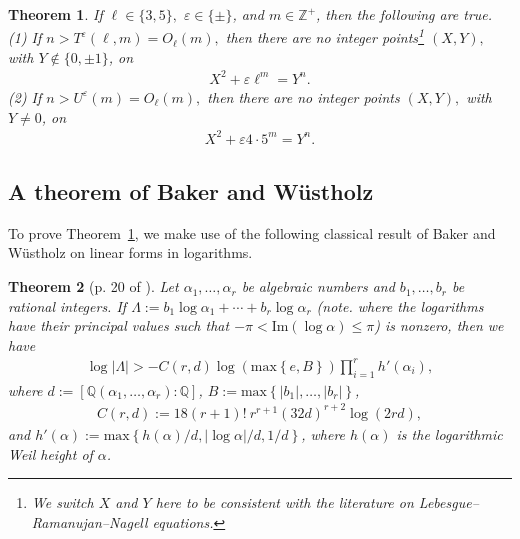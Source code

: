 \documentclass[12pt]{amsart}
\newtheorem{thm}{Theorem}[section]
\newcommand{\Z}{\mathbb{Z}}
\newcommand{\?}{\color{red}?}
\numberwithin{equation}{section}
\begin{document}
\begin{thm}\label{Explicit35}
If $\ell \in \{3, 5\},$ $\varepsilon\in \{\pm \}$, and $m\in \Z^{+}$, then the following are true.
\newline
(1)  If $n>T^{\varepsilon}(\ell,m)=O_{\ell}(m),$ then there are no integer points\footnote{We switch $X$ and $Y$ here to be consistent with the literature on Lebesgue--Ramanujan--Nagell equations.} $(X,Y),$ with $Y\not \in \{0,\pm 1\}$, on
\begin{align}\label{ell3}
X^2 +\varepsilon \ell^m=Y^n.
\end{align}
\newline
\noindent
(2) If $n>U^{\varepsilon}(m)=O_{\ell}(m),$ then there are no integer points $(X,Y),$ with $Y\neq 0$, on
\begin{align}\label{ell5}
X^2+\varepsilon 4\cdot 5^m = Y^n.
\end{align}
\end{thm}

\subsection{A theorem of Baker and W\"ustholz}
To prove Theorem~\ref{Explicit35}, we make use of the following classical result
of Baker and W\"ustholz \cite{BW} on linear forms in logarithms.


\begin{thm}[p. 20 of \cite{BW}]\label{BW}
Let $\alpha_1,\ldots,\alpha_r$ be algebraic numbers and $b_1,\ldots,b_r$ be rational integers. If $\Lambda:=b_1\log\alpha_1+\cdots+b_r\log\alpha_r$ (note. where the logarithms have their principal values such that $-\pi<\mathrm{Im}(\log \alpha)\leq\pi$) is nonzero,
 then we have
\begin{align*}
    \log|\Lambda|>-C(r,d)\log(\mathrm{max}\left\{e,B\right\})\prod_{i=1}^{r}h'(\alpha_i),
\end{align*}
where $d:=[\mathbb{Q}(\alpha_1,\ldots,\alpha_r):\mathbb{Q}]$, $B:=\mathrm{max}\left\{|b_1|,\ldots,|b_r|\right\}$,
\begin{align*}
    C(r,d):=18(r+1)!~r^{r+1}(32d)^{r+2}\log(2rd),
\end{align*}
and $h'(\alpha):=\mathrm{max}\left\{h(\alpha)/d,|\log\alpha|/d,1/d\right\}$, where $h(\alpha)$ is the logarithmic Weil height of $\alpha$.
\end{thm}
\end{document}
